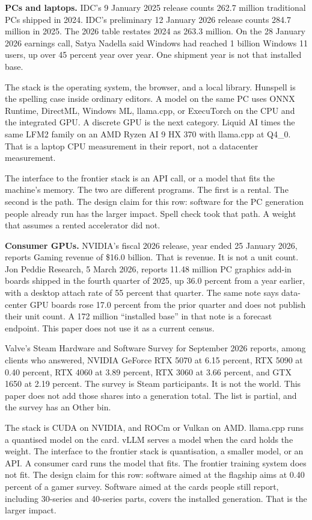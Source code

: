 \documentclass[
  10pt,
]{article}
\begin{document}
\textbf{PCs and laptops.} IDC's 9 January 2025 release counts 262.7
million traditional PCs shipped in 2024. IDC's preliminary 12 January
2026 release counts 284.7 million in 2025. The 2026 table restates 2024
as 263.3 million. On the 28 January 2026 earnings call, Satya Nadella
said Windows had reached 1 billion Windows 11 users, up over 45 percent
year over year. One shipment year is not that installed base.

The stack is the operating system, the browser, and a local library.
Hunspell is the spelling case inside ordinary editors. A model on the
same PC uses ONNX Runtime, DirectML, Windows ML, llama.cpp, or
ExecuTorch on the CPU and the integrated GPU. A discrete GPU is the next
category. Liquid AI times the same LFM2 family on an AMD Ryzen AI 9 HX
370 with llama.cpp at Q4\_0. That is a laptop CPU measurement in their
report, not a datacenter measurement.

The interface to the frontier stack is an API call, or a model that fits
the machine's memory. The two are different programs. The first is a
rental. The second is the path. The design claim for this row: software
for the PC generation people already run has the larger impact. Spell
check took that path. A weight that assumes a rented accelerator did
not.

\textbf{Consumer GPUs.} NVIDIA's fiscal 2026 release, year ended 25
January 2026, reports Gaming revenue of \$16.0 billion. That is revenue.
It is not a unit count. Jon Peddie Research, 5 March 2026, reports 11.48
million PC graphics add-in boards shipped in the fourth quarter of 2025,
up 36.0 percent from a year earlier, with a desktop attach rate of 55
percent that quarter. The same note says data-center GPU boards rose
17.0 percent from the prior quarter and does not publish their unit
count. A 172 million ``installed base'' in that note is a forecast
endpoint. This paper does not use it as a current census.

Valve's Steam Hardware and Software Survey for September 2026 reports,
among clients who answered, NVIDIA GeForce RTX 5070 at 6.15 percent, RTX
5090 at 0.40 percent, RTX 4060 at 3.89 percent, RTX 3060 at 3.66
percent, and GTX 1650 at 2.19 percent. The survey is Steam participants.
It is not the world. This paper does not add those shares into a
generation total. The list is partial, and the survey has an Other bin.

The stack is CUDA on NVIDIA, and ROCm or Vulkan on AMD. llama.cpp runs a
quantised model on the card. vLLM serves a model when the card holds the
weight. The interface to the frontier stack is quantisation, a smaller
model, or an API. A consumer card runs the model that fits. The frontier
training system does not fit. The design claim for this row: software
aimed at the flagship aims at 0.40 percent of a gamer survey. Software
aimed at the cards people still report, including 30-series and
40-series parts, covers the installed generation. That is the larger
impact.
\end{document}
